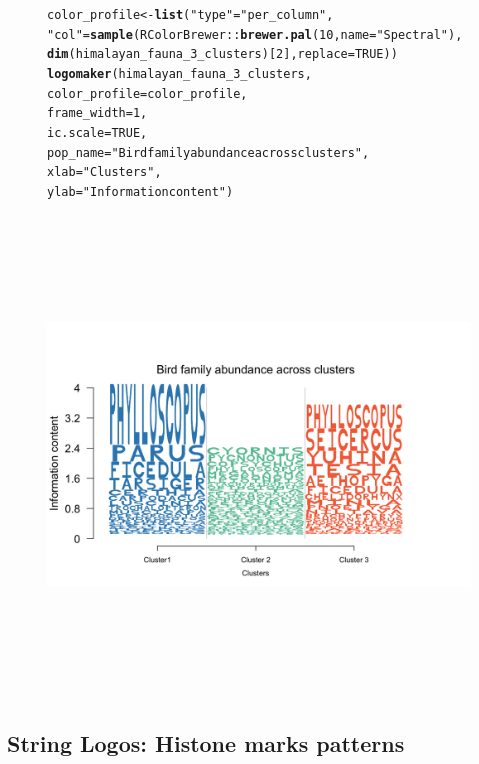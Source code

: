 \documentclass[12pt]{article}\usepackage[]{graphicx}\usepackage[usenames,dvipsnames]{color}
\makeatletter
\newcommand{\hlnum}[1]{\textcolor[rgb]{0.686,0.059,0.569}{#1}}%
\newcommand{\hlstr}[1]{\textcolor[rgb]{0.192,0.494,0.8}{#1}}%
\newcommand{\hlopt}[1]{\textcolor[rgb]{0,0,0}{#1}}%
\newcommand{\hlstd}[1]{\textcolor[rgb]{0.345,0.345,0.345}{#1}}%
\newcommand{\hlkwb}[1]{\textcolor[rgb]{0.69,0.353,0.396}{#1}}%
\newcommand{\hlkwc}[1]{\textcolor[rgb]{0.333,0.667,0.333}{#1}}%
\newcommand{\hlkwd}[1]{\textcolor[rgb]{0.737,0.353,0.396}{\textbf{#1}}}%
\newenvironment{kframe}{%
 \def\at@end@of@kframe{}%
 \ifinner\ifhmode%
  \def\at@end@of@kframe{\end{minipage}}%
  \begin{minipage}{\columnwidth}%
 \fi\fi%
 \def\FrameCommand##1{\hskip\@totalleftmargin \hskip-\fboxsep
 \colorbox{shadecolor}{##1}\hskip-\fboxsep
     \hskip-\linewidth \hskip-\@totalleftmargin \hskip\columnwidth}%
 \MakeFramed {\advance\hsize-\width
   \@totalleftmargin\z@ \linewidth\hsize
   \@setminipage}}%
 {\par\unskip\endMakeFramed%
 \at@end@of@kframe}
\newenvironment{knitrout}{}{} %
\makeatother
\begin{document}
\begin{figure}[h]
\begin{center}
\begin{knitrout}
\begin{kframe}
\begin{alltt}
\hlstd{color_profile} \hlkwb{<-} \hlkwd{list}\hlstd{(}\hlstr{"type"} \hlstd{=} \hlstr{"per_column"}\hlstd{,}
                      \hlstr{"col"} \hlstd{=} \hlkwd{sample}\hlstd{(RColorBrewer}\hlopt{::}\hlkwd{brewer.pal}\hlstd{(}\hlnum{10}\hlstd{,}\hlkwc{name} \hlstd{=} \hlstr{"Spectral"}\hlstd{),}
                       \hlkwd{dim}\hlstd{(himalayan_fauna_3_clusters)[}\hlnum{2}\hlstd{],} \hlkwc{replace}\hlstd{=}\hlnum{TRUE}\hlstd{))}
\hlkwd{logomaker}\hlstd{(himalayan_fauna_3_clusters,}
          \hlkwc{color_profile} \hlstd{= color_profile,}
          \hlkwc{frame_width} \hlstd{=} \hlnum{1}\hlstd{,}
          \hlkwc{ic.scale} \hlstd{=} \hlnum{TRUE}\hlstd{,}
          \hlkwc{pop_name} \hlstd{=} \hlstr{"Bird family abundance across clusters"}\hlstd{,}
          \hlkwc{xlab} \hlstd{=} \hlstr{"Clusters"}\hlstd{,}
          \hlkwc{ylab} \hlstd{=} \hlstr{"Information content"}\hlstd{)}
\end{alltt}
\end{kframe}
\includegraphics[width=8in,height=5in]{figure/logolas_use_10-1} 

\end{knitrout}
\end{center}
\end{figure}

\newpage

\subsection{String Logos:  Histone marks patterns}
\end{document}
